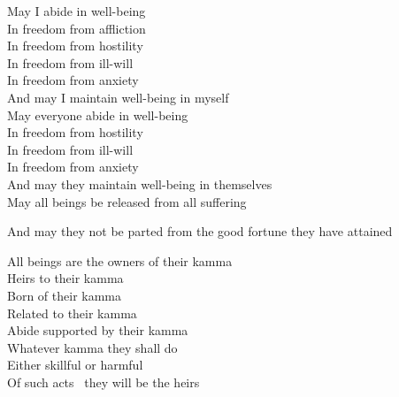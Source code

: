 \begin{english-verses}
  May I abide in well-being\\
  In freedom from affliction\\
  In freedom from hostility\\
  In freedom from ill-will\\
  In freedom from anxiety\\
  And may I maintain well-being in myself\\
  May everyone abide in well-being\\
  In freedom from hostility\\
  In freedom from ill-will\\
  In freedom from anxiety\\
  And may they maintain well-being in themselves\\
  May all beings be released from all suffering\\
  \begin{english-hang-together}
    And may they not be parted from the good fortune they have attained\makeatletter\hyperlink{endnote95-appendix}\makeatother
  \end{english-hang-together}
\end{english-verses}

\begin{english-verses}
  All beings are the owners of their kamma\ifdigital\makeatletter\hyperlink{endnote96-appendix}\makeatother\fi\\
  Heirs to their kamma\\
  Born of their kamma\\
  Related to their kamma\\
  Abide supported by their kamma\\
  Whatever kamma they shall do\\
  Either skillful or harmful\\
  Of such acts \breathmark\ they will be the heirs\\
\end{english-verses}

